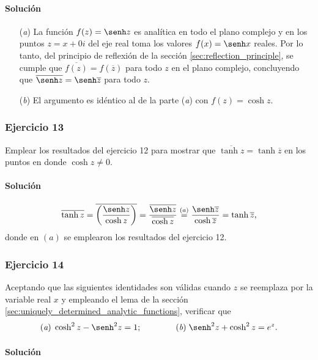 \documentclass[a4paper]{report}
\begin{document}
\paragraph{Solución} 
\begin{enumerate}
 \item[(\textit{a})] La función \(f(z)=\senh z\) es analítica en todo el plano complejo y en los puntos \(z=x+0i\) del eje real toma los valores \(f(x)=\senh x\) reales. Por lo tanto, del principio de reflexión de la sección \ref{sec:reflection_principle}, se cumple que \(\overline{f(z)}=f(\overline{z})\) para todo \(z\) en el plano complejo, concluyendo que \(\overline{\senh z}=\senh\overline{z}\) para todo \(z\).
 \item[(\textit{b})] El argumento es idéntico al de la parte (\textit{a}) con \(f(z)=\cosh z\).
\end{enumerate}

\subsubsection{Ejercicio 13}

Emplear los resultados del ejercicio 12 para mostrar que \(\overline{\tanh z}=\tanh\overline{z}\) en los puntos en donde \(\cosh z\neq0\).

\paragraph{Solución} 
\[
 \overline{\tanh z}=\overline{\left(\frac{\senh z}{\cosh z}\right)}=\frac{\overline{\senh z}}{\overline{\cosh z}}\overset{(a)}{=}\frac{\senh\overline{z}}{\cosh\overline{z}}=\tanh\overline{z},
\]
donde en \((a)\) se emplearon los resultados del ejercicio 12.

\subsubsection{Ejercicio 14}

Aceptando que las siguientes identidades son válidas cuando \(z\) se reemplaza por la variable real \(x\) y empleando el lema de la sección  \ref{sec:uniquely_determined_analytic_functions}, verificar que 
\[
 (\textit{a})\;\cosh^2z-\senh^2z=1;\qquad\qquad (\textit{b})\;\senh^2z+\cosh^2z=e^z.
\]

\paragraph{Solución} 
\end{document}
